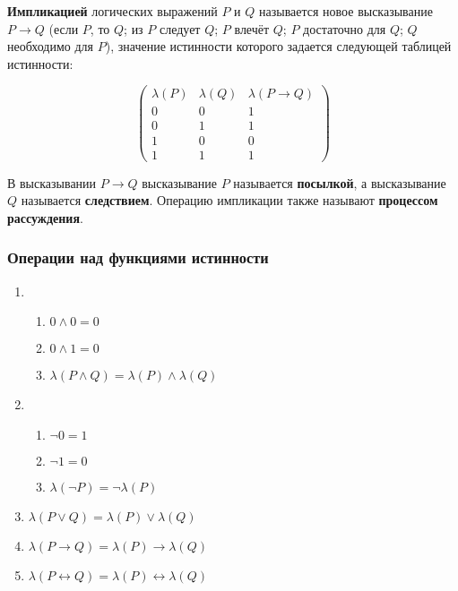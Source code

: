 \documentclass{article}
\begin{document}
\textbf{Импликацией} логических выражений $P$ и $Q$ называется новое высказывание $P \rightarrow Q$ (если $P$, то $Q$; из $P$ следует $Q$; $P$ влечёт $Q$; $P$ достаточно для $Q$; $Q$ необходимо для $P$), значение истинности которого задается следующей таблицей истинности:

$$
\begin{pmatrix}
    \lambda(P) & \lambda(Q) & \lambda(P \rightarrow Q) \\
    0 & 0 & 1 \\
    0 & 1 & 1 \\
    1 & 0 & 0 \\
    1 & 1 & 1
\end{pmatrix}
$$

В высказывании $P \rightarrow Q$ высказывание $P$ называется \textbf{посылкой}, а высказывание $Q$ называется \textbf{следствием}. Операцию импликации также называют \textbf{процессом рассуждения}.

\subsubsection{Операции над функциями истинности}

\begin{enumerate}
    \item \begin{enumerate}
        \item $0 \land 0 = 0$
        \item $0 \land 1 = 0$
        \item $\lambda(P \land Q) = \lambda(P) \land \lambda(Q)$
    \end{enumerate}
    \item \begin{enumerate}
        \item $\lnot 0 = 1$
        \item $\lnot 1 = 0$
        \item $\lambda(\lnot P) = \lnot \lambda (P)$
    \end{enumerate}
    \item $\lambda (P \lor Q) = \lambda (P) \lor \lambda (Q)$
    \item $\lambda (P \rightarrow Q) = \lambda (P) \rightarrow \lambda (Q)$
    \item $\lambda (P \leftrightarrow Q) = \lambda (P) \leftrightarrow \lambda (Q)$
\end{enumerate}
\end{document}
